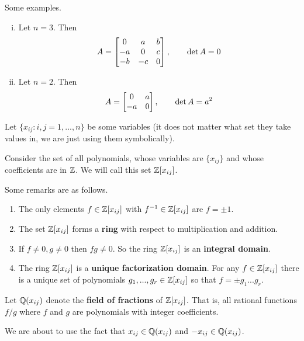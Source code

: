 \begin{example}
Some examples.
    \begin{enumerate}[i)]
    \item {Let $n=3$. Then 
    \[A = \begin{bmatrix}0&a&b\\-a&0&c\\-b&-c&0\end{bmatrix},\qquad \det A = 0\]
    }
    \item {Let $n=2$. Then
    \[A = \begin{bmatrix}0&a\\-a&0\end{bmatrix},\qquad \det A = a^2\]
    }
    \end{enumerate}
\end{example}

Let $\{x_{ij}:i,j=1,...,n\}$ be some variables (it does not matter what set they take values in, we are just using them symbolically).
\begin{defn}
Consider the set of all polynomials, whose variables are $\{x_{ij}\}$ and whose coefficients are in $\operatorname{\mathbb{Z}}$. We will call this set $\operatorname{\mathbb{Z}}[x_{ij}]$.
\end{defn}
\begin{remark*}
Some remarks are as follows.
    \begin{enumerate}
    \item {The only elements $f\in \operatorname{\mathbb{Z}}[x_{ij}]$ with $f^{-1}\in \operatorname{\mathbb{Z}}[x_{ij}]$ are $f=\pm 1$.}
    \item {
    The set $\operatorname{\mathbb{Z}}[x_{ij}]$ forms a \textbf{ring} with respect to multiplication and addition.
    }
    \item {
    If $f\neq 0,g \neq 0$ then $fg\neq 0$. So the ring $\operatorname{\mathbb{Z}}[x_{ij}]$ is an \textbf{integral domain}.
    }
    \item {The ring $\operatorname{\mathbb{Z}}[x_{ij}]$ is a \textbf{unique factorization domain}. For any $f \in \operatorname{\mathbb{Z}}[x_{ij}]$ there is a unique set of polynomials $g_1,...,g_r \in \operatorname{\mathbb{Z}}[x_{ij}]$ so that $f = \pm g_1...g_r$.
    }
    \end{enumerate}
\end{remark*}
\begin{defn}
    Let $\operatorname{\mathbb{Q}}(x_{ij})$ denote the \textbf{field of fractions} of $\operatorname{\mathbb{Z}}[x_{ij}]$. That is, all rational functions $f/g$ where $f$ and $g$ are polynomials with integer coefficients.
\end{defn}
\begin{remark*}
    We are about to use the fact that $x_{ij} \in \operatorname{\mathbb{Q}}(x_{ij})$ and $-x_{ij} \in \operatorname{\mathbb{Q}}(x_{ij})$.
\end{remark*}
